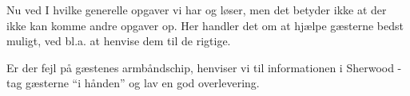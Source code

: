 Nu ved I hvilke generelle opgaver vi har og løser, men det betyder ikke 
at der ikke kan komme andre opgaver op. Her handler det om at hjælpe gæsterne 
bedst muligt, ved bl.a. at henvise dem til de rigtige.

Er der fejl på gæstenes armbåndschip, henviser vi til informationen i Sherwood - tag gæsterne ``i hånden'' 
og lav en god overlevering.

